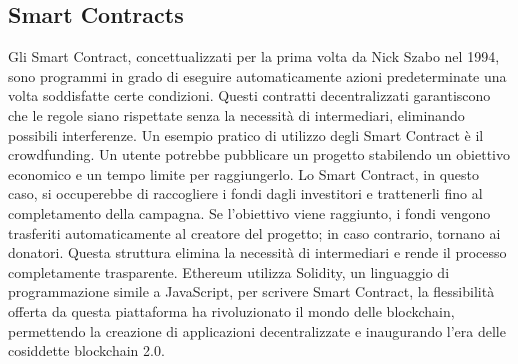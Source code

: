 \subsection{Smart Contracts}
Gli Smart Contract, concettualizzati per la prima volta da Nick Szabo nel 1994, sono programmi in grado di eseguire automaticamente azioni predeterminate una volta soddisfatte certe condizioni.
Questi contratti decentralizzati garantiscono che le regole siano rispettate senza la necessità di intermediari, eliminando possibili interferenze.
Un esempio pratico di utilizzo degli Smart Contract è il crowdfunding. Un utente potrebbe pubblicare un progetto stabilendo un obiettivo economico e un tempo limite per raggiungerlo. Lo Smart Contract, in questo caso, si occuperebbe di raccogliere i fondi dagli investitori e trattenerli fino al completamento della campagna. Se l’obiettivo viene raggiunto, i fondi vengono trasferiti automaticamente al creatore del progetto; in caso contrario, tornano ai donatori. Questa struttura elimina la necessità di intermediari e rende il processo completamente trasparente.
Ethereum utilizza Solidity, un linguaggio di programmazione simile a JavaScript, per scrivere Smart Contract, la flessibilità offerta da questa piattaforma ha rivoluzionato il mondo delle blockchain, permettendo la creazione di applicazioni decentralizzate e inaugurando l’era delle cosiddette blockchain 2.0.
